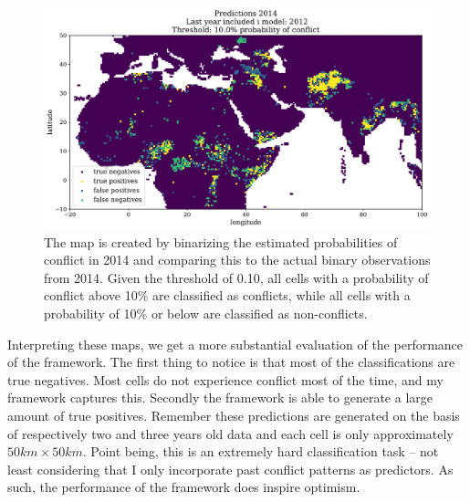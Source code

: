 \documentclass[a4paper]{article}
\begin{document}
\begin{figure}[!htb]
	\centering
	\includegraphics[scale=0.47]{confusion_map_2014.pdf}
    \caption{\footnotesize{The map is created by binarizing the estimated probabilities of conflict in 2014 and comparing this to the actual binary observations from 2014. Given the threshold of 0.10, all cells with a probability of conflict above 10\% are classified as conflicts, while all cells with a probability of 10\% or below are classified as non-conflicts.}}\label{confusion_map_2014}
\end{figure}

Interpreting these maps, we get a more substantial evaluation of the performance of the framework. The first thing to notice is that most of the classifications are true negatives. Most cells do not experience conflict most of the time, and my framework captures this. Secondly the framework is able to generate a large amount of true positives. Remember these predictions are generated on the basis of respectively two and three years old data and each cell is only approximately $50km\times50km$. Point being, this is an extremely hard classification task -- not least considering that I only incorporate past conflict patterns as predictors. As such, the performance of the framework does inspire optimism.\par
\end{document}
